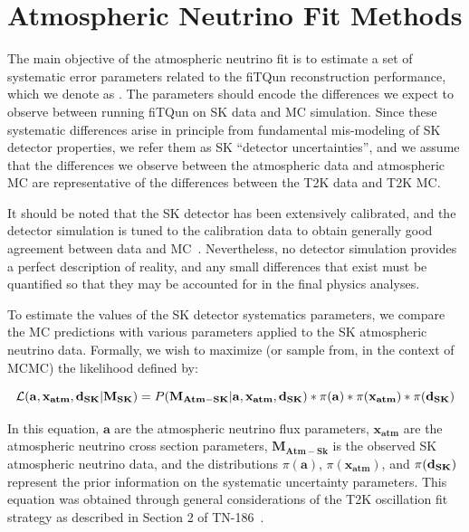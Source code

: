 


\section{Atmospheric Neutrino Fit Methods}
\label{sec:methods}

The main objective of the atmospheric neutrino fit is to estimate a set of
systematic error parameters related to the fiTQun reconstruction performance,
which we denote as \ldsk.  The \ldsk parameters should encode the differences
we expect to observe between running fiTQun on SK data and MC simulation.
Since these systematic differences arise in principle from fundamental
mis-modeling of SK detector properties, we refer them as SK ``detector
uncertainties'', and we assume that the differences we observe between the
atmospheric data and atmospheric MC are representative of the differences
between the T2K data and T2K MC.

It should be noted that the SK detector has been extensively calibrated, and
the detector simulation is tuned to the calibration data to obtain generally
good agreement between data and MC~\cite{skcalib}.  Nevertheless, no detector
simulation provides a perfect description of reality, and any small differences
that exist must be quantified so that they may be accounted for in the final
physics analyses.

To estimate the values of the SK detector systematics parameters, we compare
the MC predictions with various \ldsk parameters applied to the SK atmospheric
neutrino data. Formally, we wish to maximize (or sample from, in the context of
MCMC) the likelihood defined by:

\begin{equation}
  \label{eq:likelihood}
  \mathcal{L}(\mathbf{a},\mathbf{x_{atm}},\mathbf{d_{SK}}|\mathbf{M_{SK}}) =
  P(\mathbf{M_{Atm-SK}}|\mathbf{a},\mathbf{x_{atm}},\mathbf{d_{SK}}) \ast \pi(\mathbf{a})
  \ast \pi(\mathbf{x_{atm}}) \ast \pi(\mathbf{d_{SK}})
\end{equation}

In this equation, $\mathbf{a}$ are the atmospheric neutrino flux parameters,
$\mathbf{x_{atm}}$ are the atmospheric neutrino cross section parameters,
$\mathbf{M_{Atm-Sk}}$ is the observed SK atmospheric neutrino data, and
the distributions $\pi(\mathbf{a})$, $\pi(\mathbf{x_{atm}})$, and $\pi(\mathbf{d_{SK}})$ 
represent the prior information on the systematic uncertainty parameters. This
equation was obtained through general considerations of the T2K oscillation fit
strategy as described in Section 2 of TN-186~\cite{tn186}.


